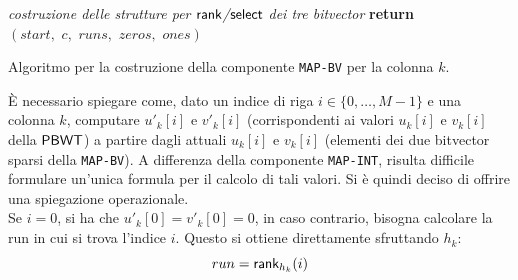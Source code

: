 \begin{algorithm}
\begin{algorithmic}[1]
    \State \textit{costruzione delle strutture per $\mbox{\rm {\sf rank}}$/$\mbox{\rm {\sf select}}$ dei tre
    bitvector} 
    \State \textbf{return}
    $(start,\,\,c,\,\,runs,\,\,zeros,\,\,ones)$  
    \EndFunction
  \end{algorithmic}
  \caption{\footnotesize{Algoritmo per la costruzione della componente
  \texttt{MAP-BV} per la colonna $k$.}}
  \label{algo:cosbv}
\end{algorithm}
È necessario spiegare come, dato un indice di riga
$i\in\{0,\ldots,M-1\}$ e una 
colonna $k$, computare $u'_k[i]$ e $v'_k[i]$ (corrispondenti ai valori $u_k[i]$
e $v_k[i]$ della
$\mbox{\rm {\sf PBWT}}$) a partire dagli attuali $u_k[i]$ e $v_k[i]$ (elementi dei due bitvector
sparsi della \texttt{MAP-BV}). A differenza della componente \texttt{MAP-INT},
risulta difficile 
formulare un'unica formula per il calcolo di tali valori. Si è quindi deciso di
offrire una spiegazione operazionale.\\
Se $i=0$, si ha che $u'_k[0]=v'_k[0]=0$, in caso contrario, bisogna 
calcolare la run 
in cui si trova l'indice $i$. Questo si ottiene direttamente sfruttando $h_k$:
\begin{equation}
  \label{eq:bv7}
  run = \mbox{\rm {\sf rank}}_{h_k}(i)
\end{equation}
